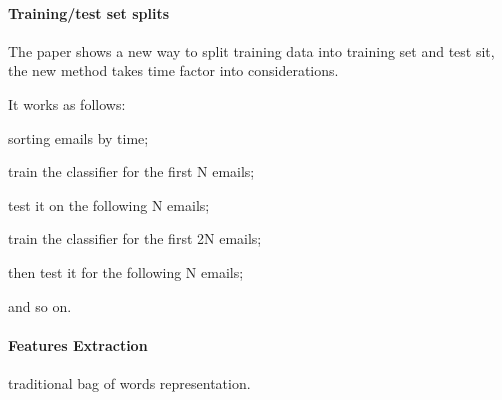 \documentclass[12pt]{article}
\newenvironment{my_itemize}
{\begin{itemize}
  \setlength{\itemsep}{0cm}
  \setlength{\parskip}{0cm}}
{\end{itemize}}
\begin{document}
\paragraph{Training/test set splits}
\begin{my_itemize}
    \item The paper shows a new way to split training data into training set 
	  and test sit, the new method takes time factor into considerations.
    \item It works as follows:
    \begin{my_itemize}
        \item sorting emails by time;
        \item train the classifier for the first N emails;
        \item test it on the following N emails;
        \item train the classifier for the first 2N emails;
        \item then test it for the following N emails;
        \item and so on.
    \end{my_itemize}
\end{my_itemize}

\paragraph{Features Extraction}
traditional bag of words representation.
\end{document}
